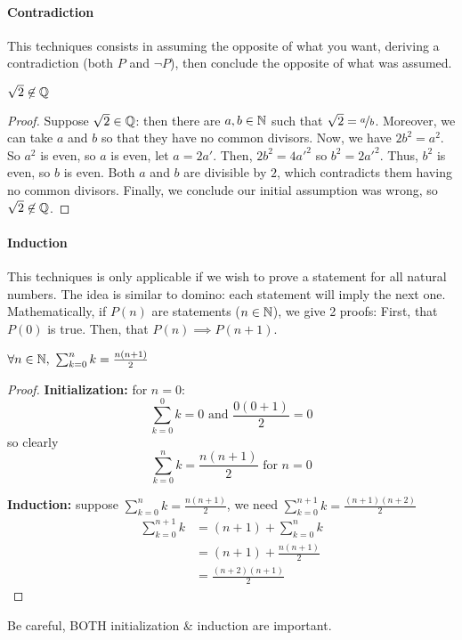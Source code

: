 \paragraph{Contradiction}
This techniques consists in assuming the opposite of what you want, deriving a contradiction (both $P$ and $\lnot P$), then conclude the opposite of what was assumed.
\begin{property}
    $\sqrt{2} \not\in \mathbb{Q}$
\end{property}
\begin{proof}
    Suppose $\sqrt{2} \in \mathbb{Q}$: then there are $a,b \in \mathbb{N}$ such that $\sqrt{2} = \nicefrac{a}{b}$.
    Moreover, we can take $a$ and $b$ so that they have no common divisors.
    Now, we have $2b^2 = a^2$. So $a^2$ is even, so $a$ is even, let $a = 2a'$.
    Then, $2b^2 = 4a'^2$ so $b^2 = 2a'^2$. Thus, $b^2$ is even, so $b$ is even.
    Both $a$ and $b$ are divisible by $2$, which contradicts them having no common divisors.
    Finally, we conclude our initial assumption was wrong, so $\sqrt{2} \not\in \mathbb{Q}$.
\end{proof}
\paragraph{Induction}
This techniques is only applicable if we wish to prove a statement for all natural numbers.
The idea is similar to domino: each statement will imply the next one.
Mathematically, if $P(n)$ are statements ($n \in \mathbb{N}$), we give 2 proofs:
First, that $P(0)$ is true.
Then, that $P(n) \implies P(n+1)$.
\begin{property}
    $\forall n \in \mathbb{N}, \ \sum_{k=0}^{n} k = \frac{n(n+1)}{2}$
\end{property}
\begin{proof}
    \textbf{Initialization:} for $n=0$:\\
    $$\sum_{k=0}^{0} k = 0 \text{ and } \frac{0(0+1)}{2}=0$$
    so clearly $$\sum_{k=0}^{n} k = \frac{n(n+1)}{2} \text{ for } n=0$$
    
    \textbf{Induction:} suppose $\sum_{k=0}^{n} k = \frac{n(n+1)}{2}$, we need $\sum_{k=0}^{n+1} k = \frac{(n+1)(n+2)}{2}$\\
    \begin{align*}
            \sum_{k=0}^{n+1} k &= (n+1) + \sum_{k=0}^{n} k\\
                               &= (n+1) + \frac{n(n+1)}{2}\\
                               &= \frac{(n+2)(n+1)}{2}
    \end{align*}
\end{proof}
Be careful, BOTH initialization \& induction are important.

